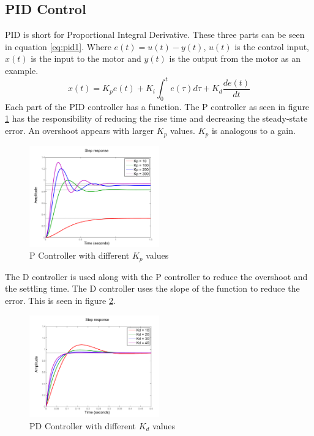 \subsection{PID Control}
PID is short for Proportional Integral Derivative. These three parts can be seen in equation \ref{eq:pid1}. Where $e(t) = u(t) - y(t)$, $u(t)$ is the control input, $x(t)$ is the input to the motor and $y(t)$ is the output from the motor as an example.
\begin{equation}
x(t) = K_p e(t) + K_i \int^t_0 e(\tau)d\tau + K_d\dfrac{de(t)}{dt}
\label{eq:pid1}
\end{equation}
Each part of the PID controller has a function. The P controller as seen in figure \ref{fig:pcontrol} has the responsibility of reducing the rise time and decreasing the steady-state error. An overshoot appears with larger $K_p$ values. $K_p$ is analogous to a gain.
\begin{figure}[H]
\centering
\includegraphics[width=0.5\textwidth]{billeder/pcontrol}
\caption{P Controller with different $K_p$ values}
\label{fig:pcontrol}
\end{figure}
The D controller is used along with the P controller to reduce the overshoot and the settling time. The D controller uses the slope of the function to reduce the error. This is seen in figure \ref{fig:pdcontrol}.
\begin{figure}[H]
\centering
\includegraphics[width=0.5\textwidth]{billeder/pdcontrol}
\caption{PD Controller with different $K_d$ values}
\label{fig:pdcontrol}
\end{figure}
